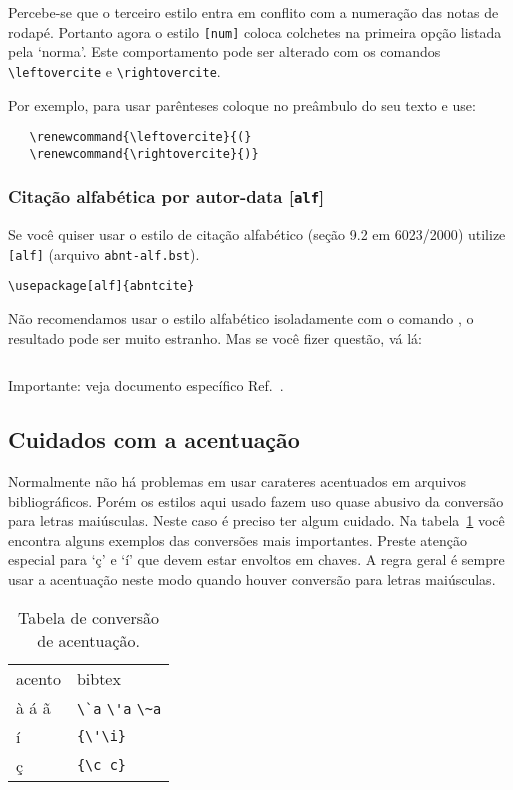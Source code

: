 \documentclass[a4paper]{ltxdoc}
\begin{document}
\DescribeMacro{\leftovercite}\DescribeMacro{\rightovercite}
Percebe-se que o terceiro estilo entra em conflito com a numeração das notas de
rodapé. Portanto agora o estilo {\tt [num]} coloca colchetes na primeira opção
listada pela `norma'\cite{NBR6023:2000}. Este comportamento pode ser alterado
com os comandos \verb+\leftovercite+ e \verb+\rightovercite+.

Por exemplo, para usar parênteses coloque no preâmbulo do seu texto e use:

\begin{verbatim}
   \renewcommand{\leftovercite}{(}
   \renewcommand{\rightovercite}{)}
\end{verbatim}

\subsubsection{Citação alfabética por autor-data [{\tt alf}]}

Se você quiser usar o estilo de citação alfabético
(seção 9.2 em 6023/2000\cite{NBR6023:2000})
utilize {\tt [alf]} (arquivo {\tt abnt-alf.bst}).
\begin{verbatim}
\usepackage[alf]{abntcite}
\end{verbatim}
Não recomendamos usar o estilo alfabético isoladamente com o comando
\verb++, o resultado pode ser muito estranho. Mas se
você fizer questão, vá lá:
\begin{verbatim}

\end{verbatim}

Importante: veja documento específico Ref.~.

\subsection{Cuidados com a acentuação}

Normalmente não há problemas em usar carateres acentuados em arquivos
bibliográficos. Porém os estilos aqui usado fazem uso quase abusivo da
conversão para letras maiúsculas. Neste caso é preciso ter algum cuidado.
Na tabela~\ref{tabela-acentos} você encontra alguns exemplos das conversões
mais importantes. Preste atenção especial para `ç' e `í' que devem estar
envoltos em chaves.
A regra geral é sempre usar a acentuação neste modo quando
houver conversão para letras maiúsculas.

\begin{table}[htbp]
\begin{center}
\begin{tabular}{ll}\hline\hline
acento & bibtex\\
à á ã & \verb+\`a+ \verb+\'a+ \verb+\~a+\\
í & \verb+{\'\i}+\\
ç & \verb+{\c c}+\\
\hline\hline
\end{tabular}
\end{center}
\caption{Tabela de conversão de acentuação.}
\label{tabela-acentos}
\end{table}
\end{document}
